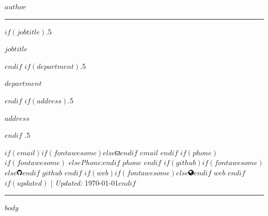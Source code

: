 \documentclass{article}
\begin{document}

\centerline{\huge $author$}

\vspace{2 mm}

\hrule

\vspace{2 mm}

$if(jobtitle)$\moveleft.5\hoffset\centerline{$jobtitle$}$endif$
$if(department)$\moveleft.5\hoffset\centerline{$department$}$endif$
$if(address)$\moveleft.5\hoffset\centerline{$address$}$endif$
\moveleft.5\hoffset\centerline{ $if(email)$$if(fontawesome)$\faEnvelopeO \hspace{1 mm}$else$\includegraphics[height=6pt]{envelope}$endif$ \href{mailto:}{\tt $email$} \hspace{1 mm}$endif$ $if(phone)$$if(fontawesome)$ \faPhone \hspace{1 mm}$else$\emph{Phone:}$endif$  $phone$  \hspace{1 mm} $endif$ $if(github)$$if(fontawesome)$\faGithub \hspace{1 mm}$else$\includegraphics[height=8pt]{github}$endif$ \href{http://github.com/$github$}{\tt $github$} \hspace{1 mm} $endif$   $if(web)$$if(fontawesome)$\faGlobe \hspace{1 mm}$else$\includegraphics[height=8pt]{globe}$endif$ \href{http://$web$}{\tt $web$}  $endif$ $if(updated)$ | \emph{Updated:} \today$endif$}

\vspace{2 mm}

\hrule

$body$ 
\end{document}
